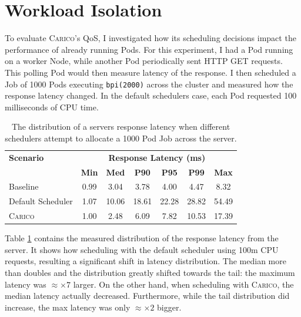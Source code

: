 \section{Workload Isolation}
\label{sec:workload-isolation}
To evaluate \textsc{Carico}'s QoS, I investigated how its scheduling decisions impact the
performance of already running Pods. For this experiment, I had a Pod running on
a worker Node, while another Pod periodically sent HTTP GET requests. This
polling Pod would then measure latency of the response. I then scheduled a Job
of 1000 Pods executing \texttt{bpi(2000)} across the cluster and measured how
the response latency changed. In the default schedulers case, each Pod requested
100 milliseconds of CPU time.

\begin{table}[h!]
\centering
    \begin{tabular}{|l|c|c|c|c|c|c|}
    \hline
    \textbf{Scenario} & \multicolumn{6}{c|}{\textbf{Response Latency (ms)}} \\
    \cline{2-7}
    & \textbf{Min} & \textbf{Med} & \textbf{P90} & \textbf{P95} & \textbf{P99} & \textbf{Max} \\
    \hline
    Baseline & 0.99 & 3.04 & 3.78 & 4.00 & 4.47 & 8.32 \\
    Default Scheduler & 1.07 & 10.06 & 18.61 & 22.28 & 28.82 & 54.49\\
    \textsc{Carico}  & 1.00 & 2.48 & 6.09 & 7.82 & 10.53 & 17.39\\
    \hline
    \end{tabular}
    \caption{The distribution of a servers response latency when different
    schedulers attempt to allocate a 1000 Pod Job across the server.}
    \label{tab:impacted-latency}
\end{table}

Table \ref{tab:impacted-latency} contains the measured distribution of the
response latency from the server. It shows how scheduling with the default
scheduler using 100m CPU requests, resulting a significant shift in latency
distribution. The median more than doubles and the distribution greatly shifted
towards the tail: the maximum latency was $\approx \times7$ larger. On the other
hand, when scheduling with \textsc{Carico}, the median latency actually decreased.
Furthermore, while the tail distribution did increase, the max latency was only
$\approx \times2$ bigger.

